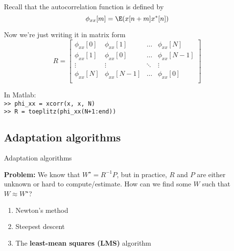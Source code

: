 \documentclass[10pt, aspectratio=169]{beamer}
\begin{document}
\begin{frame}
	Recall that the autocorrelation function is defined by
	\begin{equation*}
		\phi_{xx}[m] = \E(x[n+m]x^*[n])
	\end{equation*}

	Now we're just writing it in matrix form
	\begin{equation*}
		R = \begin{bmatrix}
				\phi_{xx}[0] & \phi_{xx}[1] & \ldots & \phi_{xx}[N] \\
				\phi_{xx}[1] & \phi_{xx}[0] & \ldots & \phi_{xx}[N-1] \\
				\vdots & \vdots & \ddots & \vdots \\
				\phi_{xx}[N] & \phi_{xx}[N-1] & \ldots & \phi_{xx}[0] \\
		\end{bmatrix} 
	\end{equation*}
	
	In Matlab: \\
	\noindent\texttt{>> phi\_xx = xcorr(x, x, N)} \\
	\noindent\texttt{>> R = toeplitz(phi\_xx(N+1:end))}
\end{frame}

\subsection{Adaptation algorithms}
\frame{\tableofcontents[currentsubsection]}

\begin{frame}{Adaptation algorithms}
\begin{center}
	\resizebox{0.7\textwidth}{!}{}
\end{center}

\textbf{Problem:} We know that $W^\star = R^{-1}P$, but in practice, $R$ and $P$ are either unknown or hard to compute/estimate. How can we find some $W$ such that $W \approx W^\star$? 

\begin{enumerate}
	\item Newton's method
	\item Steepest descent
	\item The \textbf{least-mean squares (LMS)} algorithm
\end{enumerate}

\end{frame}
\end{document}
